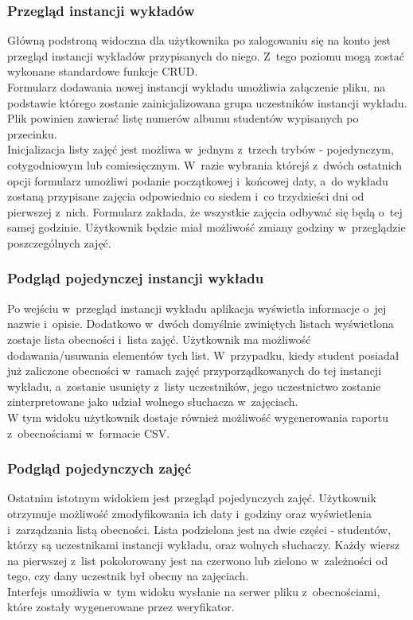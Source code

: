\documentclass[declaration,shortabstract, mgr]{iithesis}
\begin{document}
\subsubsection{Przegląd instancji wykładów}
\indent Główną podstroną widoczna dla użytkownika po zalogowaniu się na konto jest przegląd instancji wykładów przypisanych do niego. Z~tego poziomu mogą zostać wykonane standardowe funkcje CRUD\cite{crud}.\\
\indent Formularz dodawania nowej instancji wykładu umożliwia załączenie pliku, na podstawie którego zostanie zainicjalizowana grupa uczestników instancji wykładu. Plik powinien zawierać listę numerów albumu studentów wypisanych po przecinku.\\
\indent Inicjalizacja listy zajęć jest możliwa w~jednym z~trzech trybów - pojedynczym, cotygodniowym lub comiesięcznym. W~razie wybrania którejś z~dwóch ostatnich opcji formularz umożliwi podanie początkowej i~końcowej daty, a~do wykładu zostaną przypisane zajęcia odpowiednio co siedem i~co trzydzieści dni od pierwszej z~nich. Formularz zakłada, że wszystkie zajęcia odbywać się będą o~tej samej godzinie. Użytkownik będzie miał możliwość zmiany godziny w~przeglądzie poszczególnych zajęć.\\
\subsubsection{Podgląd pojedynczej instancji wykładu}
\indent Po wejściu w~przegląd instancji wykładu aplikacja wyświetla informacje o~jej nazwie i~opisie. Dodatkowo w~dwóch domyślnie zwiniętych listach wyświetlona zostaje lista obecności i~lista zajęć. Użytkownik ma możliwość dodawania/usuwania elementów tych list. W~przypadku, kiedy student posiadał już zaliczone obecności w~ramach zajęć przyporządkowanych do tej instancji wykładu, a~zostanie usunięty z~listy uczestników, jego uczestnictwo zostanie zinterpretowane jako udział wolnego słuchacza w~zajęciach.\\
\indent W tym widoku użytkownik dostaje również możliwość wygenerowania raportu z~obecnościami w~formacie CSV.\\
\subsubsection{Podgląd pojedynczych zajęć}
\indent Ostatnim istotnym widokiem jest przegląd pojedynczych zajęć. Użytkownik otrzymuje możliwość zmodyfikowania ich daty i~godziny oraz wyświetlenia i~zarządzania listą obecności. Lista podzielona jest na dwie części - studentów, którzy są uczestnikami instancji wykładu, oraz wolnych słuchaczy. Każdy wiersz na pierwszej z~list pokolorowany jest na czerwono lub zielono w~zależności od tego, czy dany uczestnik był obecny na zajęciach. \\
\indent Interfejs umożliwia w~tym widoku wysłanie na serwer pliku z~obecnościami, które zostały wygenerowane przez weryfikator.\\
\end{document}
